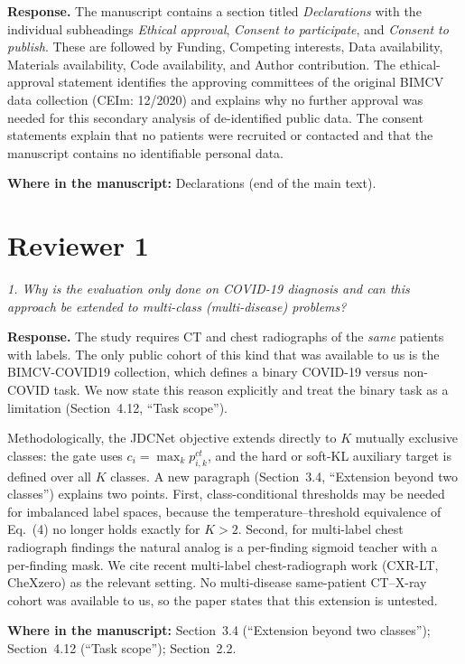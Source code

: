 \documentclass[11pt]{article}
\newenvironment{rcomment}{\par\noindent\begin{minipage}{\linewidth}\itshape\color{black!75}}{\end{minipage}\par}
\newcommand{\where}[1]{\par\noindent\textbf{Where in the manuscript:} #1\par}
\begin{document}
\textbf{Response.} The manuscript contains a section titled
\emph{Declarations} with the individual subheadings \emph{Ethical approval},
\emph{Consent to participate}, and \emph{Consent to publish}. These are
followed by Funding, Competing interests, Data availability, Materials
availability, Code availability, and Author contribution. The ethical-approval
statement identifies the approving committees of the original BIMCV data
collection (CEIm: 12/2020) and explains why no further approval was needed
for this secondary analysis of de-identified public data. The consent
statements explain that no patients were recruited or contacted and that the
manuscript contains no identifiable personal data.
\where{Declarations (end of the main text).}

\hrulefill

\section*{Reviewer 1}

\begin{rcomment}
1. Why is the evaluation only done on COVID-19 diagnosis and can this approach be extended to multi-class (multi-disease) problems?
\end{rcomment}

\textbf{Response.} The study requires CT and chest radiographs of the
\emph{same} patients with labels. The only public cohort of this kind that was
available to us is the BIMCV-COVID19 collection, which defines a binary
COVID-19 versus non-COVID task. We now state this reason explicitly and treat
the binary task as a limitation (Section~4.12, ``Task scope'').

Methodologically, the JDCNet objective extends directly to $K$ mutually
exclusive classes: the gate uses $c_i=\max_k p^{ct}_{i,k}$, and the hard or
soft-KL auxiliary target is defined over all $K$ classes. A new paragraph
(Section~3.4, ``Extension beyond two classes'') explains two points. First,
class-conditional thresholds may be needed for imbalanced label spaces, because
the temperature--threshold equivalence of Eq.~(4) no longer holds exactly for
$K>2$. Second, for multi-label chest radiograph findings the natural analog is
a per-finding sigmoid teacher with a per-finding mask. We cite recent
multi-label chest-radiograph work (CXR-LT, CheXzero) as the relevant setting.
No multi-disease same-patient CT--X-ray cohort was available to us, so the
paper states that this extension is untested.
\where{Section~3.4 (``Extension beyond two classes''); Section~4.12 (``Task scope''); Section~2.2.}
\end{document}
